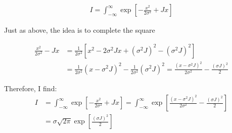 \documentclass[/home/jesse/Analysis/FemtoAnalysis/AnalysisNotes/AnalysisNoteJBuxton.tex]{subfiles}
\begin{document}
\begin{equation}
\begin{aligned}
I = \int_{-\infty}^{\infty}\exp\left[ -\frac{x^{2}}{2\sigma^{2}} + Jx \right]
\end{aligned}
\end{equation}

Just as above, the idea is to complete the square

\begin{equation}
\begin{aligned}
\frac{x^{2}}{2\sigma^{2}} - Jx &= \frac{1}{2\sigma^{2}} \left[ x^{2} - 2\sigma^{2}Jx + (\sigma^{2}J)^{2} - (\sigma^{2}J)^{2} \right] \\
&= \frac{1}{2\sigma^{2}} \left( x - \sigma^{2}J \right)^{2} - \frac{1}{2\sigma^{2}}(\sigma^{2}J)^{2} =  \frac{\left( x - \sigma^{2}J \right)^{2}}{2\sigma^{2}} - \frac{(\sigma J)^{2}}{2}
\end{aligned}
\end{equation}

Therefore, I find:
\begin{equation}
\begin{aligned}
I &= \int_{-\infty}^{\infty}\exp\left[ -\frac{x^{2}}{2\sigma^{2}} + Jx \right] = \int_{-\infty}^{\infty}\exp\left[ \frac{\left( x - \sigma^{2}J \right)^{2}}{2\sigma^{2}} - \frac{(\sigma J)^{2}}{2} \right]  \\
&= \sigma\sqrt{2\pi}\exp \left[ \frac{(\sigma J)^{2}}{2} \right]
\end{aligned}
\end{equation}
\end{document}
